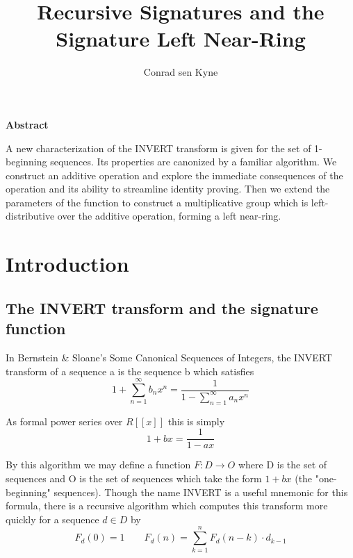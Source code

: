 \documentclass{article}
\title{\Large Recursive Signatures and the Signature Left Near-Ring}
\author{Conrad sen Kyne}
\date{}
\begin{document}
\maketitle

\begin{center}
\textbf{Abstract}
\end{center}

A new characterization of the INVERT transform is given for the set of 1-beginning sequences. Its properties are canonized by a familiar algorithm. We construct an additive operation and explore the immediate consequences of the operation and its ability to streamline identity proving. Then we extend the parameters of the function to construct a multiplicative group which is left-distributive over the additive operation, forming a left near-ring.

\tableofcontents

\section{Introduction}

\subsection{The INVERT transform and the signature function}

In Bernstein \& Sloane’s Some Canonical Sequences of Integers, the INVERT transform of a sequence a is the sequence b which satisfies \begin{equation}1 +  \sum_{n=1}^\infty b_n x^n = \frac{1}{1 - \displaystyle \sum_{n=1}^\infty a_n x^n}\end{equation}

\noindent As formal power series over $R[[x]]$ this is simply \begin{equation}1 + bx = \frac{1}{1 - ax}\label{invert}\end{equation}

\noindent By this algorithm we may define a function $F: D \rightarrow O$ where D is the set of sequences and O is the set of sequences which take the form $1 + bx$ (the "one-beginning" sequences). Though the name INVERT is a useful mnemonic for this formula, there is a recursive algorithm which computes this transform more quickly for a sequence $d \in D$ by \begin{equation}F_{d}(0) = 1 \qquad  F_{d}(n) = \sum_{k=1}^{n} F_{d}(n-k) \cdot d_{k-1} \end{equation}
\end{document}
